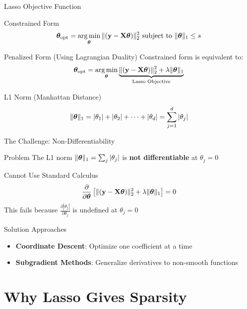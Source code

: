 \documentclass{beamer}
\begin{document}
\begin{frame}{Lasso Objective Function}
\begin{definitionbox}{Constrained Form}
$$\boldsymbol{\theta}_{\text{opt}} = \operatorname*{arg\,min}_{\boldsymbol{\theta}} \|(\mathbf{y}-\mathbf{X}\boldsymbol{\theta})\|_2^2 \text{ subject to } \|\boldsymbol{\theta}\|_1 \leq s$$
\end{definitionbox}
\pause

\begin{theorembox}{Penalized Form (Using Lagrangian Duality)}
Constrained form is equivalent to:
$$\boldsymbol{\theta}_{\text{opt}} = \operatorname*{arg\,min}_{\boldsymbol{\theta}} \underbrace{\|(\mathbf{y}-\mathbf{X}\boldsymbol{\theta})\|_2^2 + \lambda \|\boldsymbol{\theta}\|_1}_{\text{Lasso Objective}}$$
\end{theorembox}
\pause

\begin{codebox}{L1 Norm (Manhattan Distance)}
$$\|\boldsymbol{\theta}\|_1 = |\theta_1| + |\theta_2| + \cdots + |\theta_d| = \sum_{j=1}^d |\theta_j|$$
\end{codebox}
\end{frame}

\begin{frame}{The Challenge: Non-Differentiability}
\begin{alertbox}{Problem}
The L1 norm $\|\boldsymbol{\theta}\|_1 = \sum_j |\theta_j|$ is \textbf{not differentiable} at $\theta_j = 0$
\end{alertbox}
\pause

\begin{codebox}{Cannot Use Standard Calculus}
$$\frac{\partial}{\partial \boldsymbol{\theta}} \left[ \|(\mathbf{y}-\mathbf{X}\boldsymbol{\theta})\|_2^2 + \lambda \|\boldsymbol{\theta}\|_1 \right] = 0$$
This fails because $\frac{\partial |\theta_j|}{\partial \theta_j}$ is undefined at $\theta_j = 0$
\end{codebox}

\begin{keypointsbox}{Solution Approaches}
{\small
\begin{itemize}
\item \textbf{Coordinate Descent}: Optimize one coefficient at a time
\item \textbf{Subgradient Methods}: Generalize derivatives to non-smooth functions
\end{itemize}
}
\end{keypointsbox}
\end{frame}

\section{Why Lasso Gives Sparsity}
\end{document}
